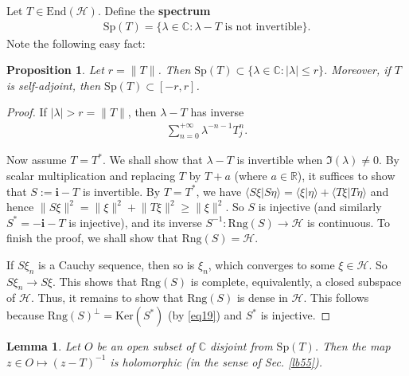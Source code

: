 \documentclass[12pt,b5paper,notitlepage]{article}
\theoremstyle{definition}
\theoremstyle{plain}
\newtheorem{pp}[df]{Proposition}
\newtheorem{lm}[df]{Lemma}
\newcommand{\mc}{\mathcal}
\newcommand{\End}{\mathrm{End}} %
\newcommand{\bk}[1]{\langle {#1}\rangle}
\newcommand{\im}{\mathbf{i}}
\newcommand{\Cbb}{\mathbb C}
\newcommand{\Rbb}{\mathbb R}
\newcommand{\Ker}{\mathrm{Ker}}
\newcommand{\Sp}{\mathrm{Sp}}
\newcommand{\Rng}{\mathrm{Rng}}
\numberwithin{equation}{section}
\begin{document}
Let $T\in\End(\mc H)$. Define the \textbf{spectrum}
\begin{align}
	\Sp(T)=\{\lambda\in\Cbb:\lambda-T\text{ is not invertible}\}.	\label{eq23}
\end{align}
Note the following easy fact:

\begin{pp}
Let $r=\lVert T\lVert$. Then $\Sp(T)\subset \{\lambda\in\Cbb:|\lambda|\leq r\}$. Moreover, if $T$ is self-adjoint, then $\Sp(T)\subset[-r,r]$.
\end{pp}


\begin{proof}
If $|\lambda|>r=\lVert T\lVert$, then $\lambda-T$ has inverse
\begin{align}
\sum_{n=0}^{+\infty}\lambda^{-n-1}T_j^n.\label{eq20}
\end{align}

Now assume $T=T^*$. We shall show that $\lambda-T$ is invertible when $\Im(\lambda)\neq 0$. By scalar multiplication and replacing $T$ by $T+a$ (where $a\in\Rbb$), it suffices to show that $S:=\im-T$ is invertible. By $T=T^*$, we have $\bk{S\xi|S\eta}=\bk{\xi|\eta}+\bk{T\xi|T\eta}$ and hence $\lVert S\xi\lVert ^2=\lVert \xi\lVert^2+\lVert T\xi\lVert^2\geq \lVert \xi\lVert^2$. So $S$ is injective (and similarly $S^*=-\im-T$ is injective), and its inverse $S^{-1}:\Rng(S)\rightarrow\mc H$ is continuous. To finish the proof, we shall show that $\Rng(S)=\mc H$. 

If $S\xi_n$ is a Cauchy sequence, then so is $\xi_n$, which converges to some $\xi\in\mc H$. So $S\xi_n\rightarrow S\xi$. This shows that $\Rng(S)$ is complete, equivalently, a closed subspace of $\mc H$.  Thus, it remains to show that $\Rng(S)$ is dense in $\mc H$. This follows because $\Rng(S)^\perp=\Ker(S^*)$ (by \eqref{eq19}) and $S^*$ is injective.
\end{proof}


\begin{lm}\label{lb4}
Let $O$ be an open subset of $\Cbb$ disjoint from $\Sp(T)$. Then the map $z\in O\mapsto (z-T)^{-1}$ is holomorphic (in the sense of Sec. \ref{lb55}).
\end{lm}
\end{document}
